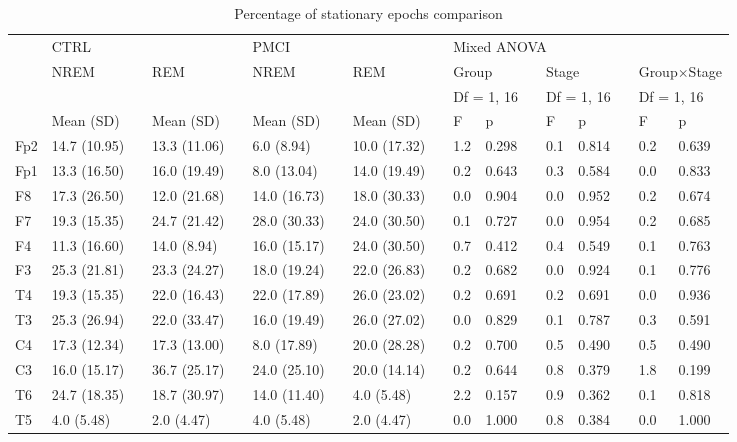 \documentclass[10pt]{article}
\begin{document}
\begin{table}
\caption{Percentage of stationary epochs comparison}
\begin{small}
\begin{tabular}{lllllllllllllllll}
\toprule
 & \multicolumn{3}{l}{CTRL} & \phantom{.}  & \multicolumn{3}{l}{PMCI} & \phantom{.} & \multicolumn{8}{l}{Mixed ANOVA} \\
\cmidrule{2-4} \cmidrule{6-8} \cmidrule{10-17}
 & NREM &  & REM   & & NREM &  & REM  &  & 
   \multicolumn{2}{l}{Group} &  & \multicolumn{2}{l}{Stage} & & \multicolumn{2}{l}{Group$\times$Stage}  \\
 &&&&&&&&& \multicolumn{2}{l}{Df = 1, 16} &  &  \multicolumn{2}{l}{Df = 1, 16}  &  &  \multicolumn{2}{l}{Df = 1, 16}  \\
\cmidrule{2-2} \cmidrule{4-4} \cmidrule{6-6} \cmidrule{8-8} \cmidrule{10-11} \cmidrule{13-14} \cmidrule{16-17}    
 & Mean (SD) &  & Mean (SD) &  & Mean (SD) &  & Mean (SD) &  & F & p &  & F & p &  & F & p \\
\midrule
Fp2&14.7 (10.95)&&13.3 (11.06)&&6.0 (8.94)&&10.0 (17.32)&&1.2&0.298&&0.1&0.814&&0.2&0.639 \\
Fp1&13.3 (16.50)&&16.0 (19.49)&&8.0 (13.04)&&14.0 (19.49)&&0.2&0.643&&0.3&0.584&&0.0&0.833 \\
F8&17.3 (26.50)&&12.0 (21.68)&&14.0 (16.73)&&18.0 (30.33)&&0.0&0.904&&0.0&0.952&&0.2&0.674 \\
F7&19.3 (15.35)&&24.7 (21.42)&&28.0 (30.33)&&24.0 (30.50)&&0.1&0.727&&0.0&0.954&&0.2&0.685 \\
F4&11.3 (16.60)&&14.0 (8.94)&&16.0 (15.17)&&24.0 (30.50)&&0.7&0.412&&0.4&0.549&&0.1&0.763 \\
F3&25.3 (21.81)&&23.3 (24.27)&&18.0 (19.24)&&22.0 (26.83)&&0.2&0.682&&0.0&0.924&&0.1&0.776 \\
T4&19.3 (15.35)&&22.0 (16.43)&&22.0 (17.89)&&26.0 (23.02)&&0.2&0.691&&0.2&0.691&&0.0&0.936 \\
T3&25.3 (26.94)&&22.0 (33.47)&&16.0 (19.49)&&26.0 (27.02)&&0.0&0.829&&0.1&0.787&&0.3&0.591 \\
C4&17.3 (12.34)&&17.3 (13.00)&&8.0 (17.89)&&20.0 (28.28)&&0.2&0.700&&0.5&0.490&&0.5&0.490 \\
C3&16.0 (15.17)&&36.7 (25.17)&&24.0 (25.10)&&20.0 (14.14)&&0.2&0.644&&0.8&0.379&&1.8&0.199 \\
T6&24.7 (18.35)&&18.7 (30.97)&&14.0 (11.40)&&4.0 (5.48)&&2.2&0.157&&0.9&0.362&&0.1&0.818 \\
T5&4.0 (5.48)&&2.0 (4.47)&&4.0 (5.48)&&2.0 (4.47)&&0.0&1.000&&0.8&0.384&&0.0&1.000 \\

\end{tabular}
\end{small}
\end{table}
\end{document}
